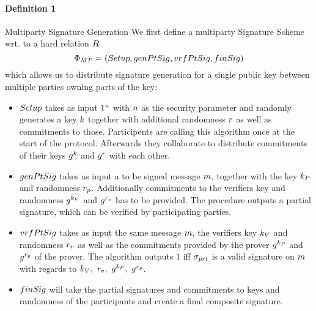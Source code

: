 \paragraph{Definition 1}{Multiparty Signature Generation}
We first define a multiparty Signature Scheme wrt. to a hard relation $R$
\[ \Phi_{MP} = (Setup, genPtSig, vrfPtSig, finSig) \]
which allows us to distribute signature generation for a single public key between multiple parties owning parts of the key:
\begin{itemize}
    \item $Setup$ takes as input $1^n$ with $n$ as the security parameter and randomly generates a key $k$ together with additional randomness $r$ as well
    as commitments to those. Participents are calling this algorithm once at the start of the protocol. Afterwards they collaborate to distribute commitments of their keys $g^{k}$ and $g^{r}$
    with each other.
    \item $genPtSig$ takes as input a to be signed message $m$, together with the key $k_P$ and randomness $r_{p}$. Additionally commitments to the verifiers
    key and randomness $g^{k_V}$ and $g^{r_{v}}$ has to be provided. The procedure outputs a partial signature, which can be verified by participating parties.
    \item $vrfPtSig$ takes as input the same message $m$, the verifiers key $k_V$ and randomness $r_{v}$ as well as the commitments provided by the prover
    $g^{k_P}$ and $g^{r_{p}}$ of the prover. The algorithm outputs $1$ iff $\sigma_{prt}$ is a valid signature on $m$ with regards to
    $k_V ,~ r_{v} ,~ g^{k_P} ,~ g^{r_{p}}$.
    \item $finSig$ will take the partial signatures and commitments to keys and randomness of the participants and create a final composite signature.
\end{itemize}

